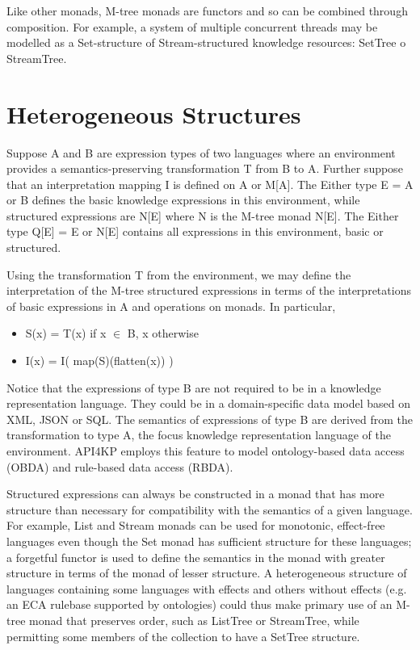 \documentclass[runningheads]{llncs}
\begin{document}
Like other monads, M-tree monads are functors and so can be combined through composition.
For example, a system of multiple concurrent threads may be modelled as a Set-structure of Stream-structured knowledge resources: SetTree o StreamTree.


\section{Heterogeneous Structures}
Suppose A and B are expression types of two languages where an environment provides a semantics-preserving transformation T from B to A.
Further suppose that an interpretation mapping I is defined on A or M[A].
The Either type E = A or B defines the basic knowledge expressions in this environment, while structured expressions are N[E] where N is the M-tree monad  N[E].
The Either type Q[E] = E or N[E] contains all expressions in this environment, basic or structured. 

Using the transformation T from the environment, we may define the interpretation of the M-tree structured expressions in terms of the interpretations of basic expressions in A and operations on monads. In particular,
\begin{itemize}
\item S(x) = T(x) if x $\in$ B, x otherwise
\item I(x) = I( map(S)(flatten(x)) )
\end{itemize}
Notice that the expressions of type B are not required to be in a knowledge representation language. They could be in a domain-specific data model based on XML, JSON or SQL. The semantics of expressions of type B are derived from the transformation to type A, the focus  knowledge representation language of the environment. API4KP employs this feature to model ontology-based data access (OBDA) and rule-based data access (RBDA).

Structured expressions can always be constructed in a monad that has more structure than necessary for compatibility with the semantics of a given language.
For example, List and Stream monads can be used for monotonic, effect-free languages even though the Set monad has sufficient structure for these languages;
a forgetful functor is used to define the semantics in the monad with greater structure in terms of the monad of lesser structure.
A heterogeneous structure of languages containing some languages with effects and others without effects (e.g. an ECA rulebase supported by ontologies) could thus make primary use of an M-tree monad that preserves order, such as ListTree or StreamTree, while permitting some members of the collection to have a SetTree structure. 
%
\end{document}
